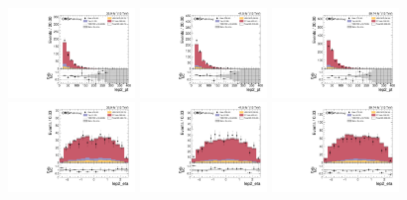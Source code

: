 \begin{figure}[!ht]
  \centering
  \includegraphics[width=0.30\textwidth]{analysis_plots/2016_zv/cr_vjets_m/lep2_pt.pdf}
  \includegraphics[width=0.30\textwidth]{analysis_plots/2017_zv/cr_vjets_m/lep2_pt.pdf}
  \includegraphics[width=0.30\textwidth]{analysis_plots/2018_zv/cr_vjets_m/lep2_pt.pdf} \\
  \includegraphics[width=0.30\textwidth]{analysis_plots/2016_zv/cr_vjets_m/lep2_eta.pdf}
  \includegraphics[width=0.30\textwidth]{analysis_plots/2017_zv/cr_vjets_m/lep2_eta.pdf}
  \includegraphics[width=0.30\textwidth]{analysis_plots/2018_zv/cr_vjets_m/lep2_eta.pdf} \\

\end{figure}
